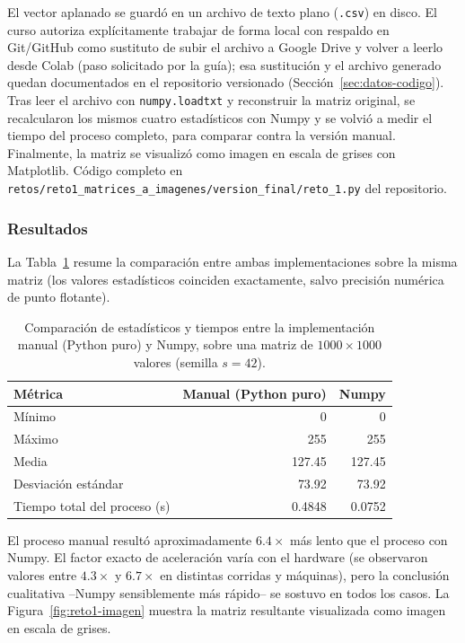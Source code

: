 \documentclass[11pt]{article}
\begin{document}
El vector aplanado se guardó en un archivo de texto plano (\texttt{.csv})
en disco. El curso autoriza explícitamente trabajar de forma local con
respaldo en Git/GitHub como sustituto de subir el archivo a Google Drive y
volver a leerlo desde Colab (paso solicitado por la guía); esa sustitución
y el archivo generado quedan documentados en el repositorio versionado
(Sección~\ref{sec:datos-codigo}). Tras leer el archivo con
\texttt{numpy.loadtxt} y reconstruir la matriz original, se recalcularon
los mismos cuatro estadísticos con Numpy y se volvió a medir el tiempo del
proceso completo, para comparar contra la versión manual. Finalmente, la
matriz se visualizó como imagen en escala de grises con Matplotlib. Código
completo en
\texttt{retos/reto1\_matrices\_a\_imagenes/version\_final/reto\_1.py} del
repositorio.

\subsubsection{Resultados}

La Tabla~\ref{tab:reto1-stats} resume la comparación entre ambas
implementaciones sobre la misma matriz (los valores estadísticos
coinciden exactamente, salvo precisión numérica de punto flotante).

\begin{table}[h]
\centering
\caption{Comparación de estadísticos y tiempos entre la implementación manual (Python puro) y Numpy, sobre una matriz de $1000\times1000$ valores (semilla $s=42$).}
\label{tab:reto1-stats}
\begin{tabular}{lrr}
\toprule
Métrica & Manual (Python puro) & Numpy \\
\midrule
Mínimo & 0 & 0 \\
Máximo & 255 & 255 \\
Media & 127.45 & 127.45 \\
Desviación estándar & 73.92 & 73.92 \\
\midrule
Tiempo total del proceso (s) & 0.4848 & 0.0752 \\
\bottomrule
\end{tabular}
\end{table}

El proceso manual resultó aproximadamente $6.4\times$ más lento que el
proceso con Numpy. El factor exacto de aceleración varía con el hardware
(se observaron valores entre $4.3\times$ y $6.7\times$ en distintas
corridas y máquinas), pero la conclusión cualitativa --Numpy sensiblemente
más rápido-- se sostuvo en todos los casos. La Figura~\ref{fig:reto1-imagen}
muestra la matriz resultante visualizada como imagen en escala de grises.
\end{document}

